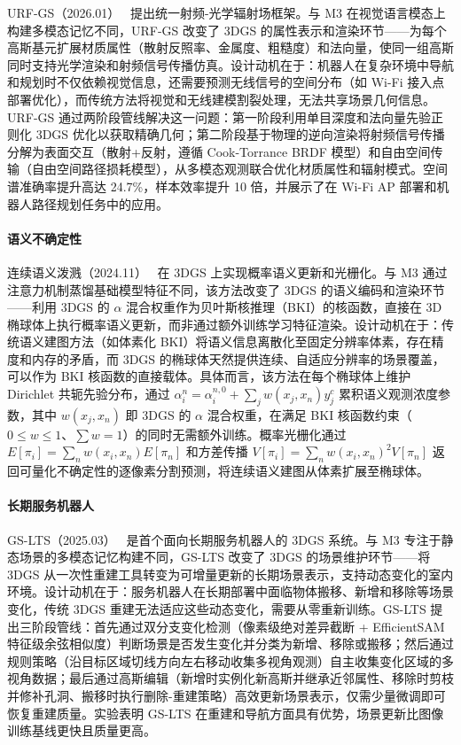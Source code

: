 URF-GS（2026.01）~\cite{2601_19216} 提出统一射频-光学辐射场框架。与 M3 在视觉语言模态上构建多模态记忆不同，URF-GS 改变了 3DGS 的属性表示和渲染环节——为每个高斯基元扩展材质属性（散射反照率、金属度、粗糙度）和法向量，使同一组高斯同时支持光学渲染和射频信号传播仿真。设计动机在于：机器人在复杂环境中导航和规划时不仅依赖视觉信息，还需要预测无线信号的空间分布（如 Wi-Fi 接入点部署优化），而传统方法将视觉和无线建模割裂处理，无法共享场景几何信息。URF-GS 通过两阶段管线解决这一问题：第一阶段利用单目深度和法向量先验正则化 3DGS 优化以获取精确几何；第二阶段基于物理的逆向渲染将射频信号传播分解为表面交互（散射+反射，遵循 Cook-Torrance BRDF 模型）和自由空间传输（自由空间路径损耗模型），从多模态观测联合优化材质属性和辐射模式。空间谱准确率提升高达 24.7\%，样本效率提升 10 倍，并展示了在 Wi-Fi AP 部署和机器人路径规划任务中的应用。

\paragraph{语义不确定性}

连续语义泼溅（2024.11）~\cite{2411_02547} 在 3DGS 上实现概率语义更新和光栅化。与 M3 通过注意力机制蒸馏基础模型特征不同，该方法改变了 3DGS 的语义编码和渲染环节——利用 3DGS 的 $\alpha$ 混合权重作为贝叶斯核推理（BKI）的核函数，直接在 3D 椭球体上执行概率语义更新，而非通过额外训练学习特征渲染。设计动机在于：传统语义建图方法（如体素化 BKI）将语义信息离散化至固定分辨率体素，存在精度和内存的矛盾，而 3DGS 的椭球体天然提供连续、自适应分辨率的场景覆盖，可以作为 BKI 核函数的直接载体。具体而言，该方法在每个椭球体上维护 Dirichlet 共轭先验分布，通过 $\alpha_i^n = \alpha_i^{n,0} + \sum_j w(x_j, x_n) y_j^c$ 累积语义观测浓度参数，其中 $w(x_j, x_n)$ 即 3DGS 的 $\alpha$ 混合权重，在满足 BKI 核函数约束（$0 \leq w \leq 1$、$\sum w = 1$）的同时无需额外训练。概率光栅化通过 $E[\pi_i] = \sum_n w(x_i, x_n) E[\pi_n]$ 和方差传播 $V[\pi_i] = \sum_n w(x_i, x_n)^2 V[\pi_n]$ 返回可量化不确定性的逐像素分割预测，将连续语义建图从体素扩展至椭球体。

\paragraph{长期服务机器人}

GS-LTS（2025.03）~\cite{2503_17733} 是首个面向长期服务机器人的 3DGS 系统。与 M3 专注于静态场景的多模态记忆构建不同，GS-LTS 改变了 3DGS 的场景维护环节——将 3DGS 从一次性重建工具转变为可增量更新的长期场景表示，支持动态变化的室内环境。设计动机在于：服务机器人在长期部署中面临物体搬移、新增和移除等场景变化，传统 3DGS 重建无法适应这些动态变化，需要从零重新训练。GS-LTS 提出三阶段管线：首先通过双分支变化检测（像素级绝对差异截断 + EfficientSAM 特征级余弦相似度）判断场景是否发生变化并分类为新增、移除或搬移；然后通过规则策略（沿目标区域切线方向左右移动收集多视角观测）自主收集变化区域的多视角数据；最后通过高斯编辑（新增时实例化新高斯并继承近邻属性、移除时剪枝并修补孔洞、搬移时执行删除-重建策略）高效更新场景表示，仅需少量微调即可恢复重建质量。实验表明 GS-LTS 在重建和导航方面具有优势，场景更新比图像训练基线更快且质量更高。

